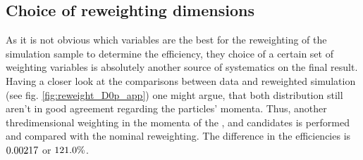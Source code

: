 \subsection{Choice of reweighting dimensions}
As it is not obvious which variables are the best for the reweighting of the \LbToDpmunuX simulation sample to determine the efficiency, they choice of a certain set of weighting variables is absolutely another source of systematics on the final result.
Having a closer look at the comparisons between data and reweighted simulation (see fig. \ref{fig:reweight_D0p_app}) one might argue, that both distribution still aren't in good agreement regarding the particles' momenta.
Thus, another thredimensional weighting in the momenta of the \Dz\proton\mun, \Dz\mun and \Dz candidates is performed and compared with the nominal reweighting.
The difference in the efficiencies \effDp is $0.00217$ or $121.0\%$.

